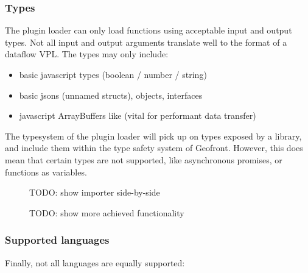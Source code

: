 \subsubsection*{Types}
The plugin loader can only load functions using acceptable input and output types. 
Not all input and output arguments translate well to the format of a dataflow VPL. 
The types may only include: 
\begin{itemize}
  \item basic javascript types (boolean / number / string)
  \item basic jsons (unnamed structs), objects, interfaces 
  \item javascript ArrayBuffers like  (vital for performant data transfer)
\end{itemize}
The typesystem of the plugin loader will pick up on types exposed by a library, and include them within the type safety system of Geofront. 
However, this does mean that certain types are not supported, like asynchronous promises, or functions as variables. 

\begin{figure}
  \centering
  \graphicspath{ {../../assets/diagrams/} }
  \caption[]{TODO: show importer side-by-side}
  \label{fig:todo-1}
\end{figure}


\begin{figure}
  \centering
  \graphicspath{ {../../assets/diagrams/} }
  \caption[]{TODO: show more achieved functionality}
  \label{fig:todo-2}
\end{figure}

\subsubsection*{Supported languages}
Finally, not all languages are equally supported:


